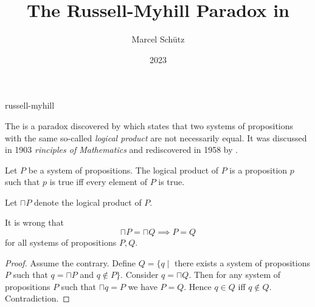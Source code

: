 \documentclass{stex}
\begin{document}
\title{The Russell-Myhill Paradox in \Naproche}
\author{Marcel Schütz}
\date{2023}
\maketitle
\begin{smodule}{russell-myhill}
\begin{sparagraph}
  \noindent The \emph{} is a paradox discovered by  which states that two systems of propositions with the same so-called \emph{logical product} are not necessarily equal.
  It was discussed in  1903 \emph{rinciples of Mathematics} \cite[Appendix B]{Russell1903} and rediscovered in 1958 by  \cite{Myhill1958}.
\end{sparagraph}

\begin{forthel}

  \begin{signature*}
    Let $P$ be a system of propositions.
    The logical product of $P$ is a proposition $p$ such that $p$ is true iff every element of $P$ is true.
  \end{signature*}

  Let $\sqcap P$ denote the logical product of $P$.

  \begin{theorem*}\label{russell_myhill_paradox}
    It is wrong that
    \[ \sqcap P = \sqcap Q \implies P = Q \]
    for all systems of propositions $P, Q$.
  \end{theorem*}
  \begin{proof}
    Assume the contrary.
    Define $Q = \{ q \mid$ there exists a system of propositions $P$ such that $q = \sqcap P$ and $q \notin P \}$.
    Consider $q = \sqcap Q$.
    Then for any system of propositions $P$ such that $\sqcap q = P$ we have $P = Q$.
    Hence $q \in Q$ iff $q \notin Q$.
    Contradiction.
  \end{proof}
\end{forthel}
\end{smodule}
\printbibliography
\end{document}
